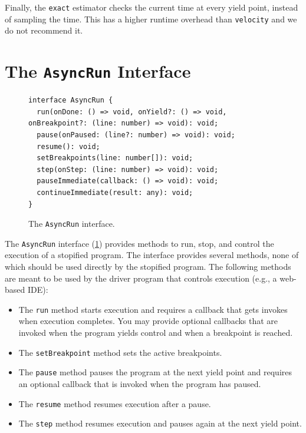 \documentclass[10pt]{book}
\begin{document}
Finally, the \texttt{exact} estimator checks the current time at every
yield point, instead of sampling the time. This has a higher runtime
overhead than \texttt{velocity} and we do not recommend it.

\section{The \texttt{AsyncRun} Interface\label{asyncrun}}
\lstset{language=js}

\begin{figure}
\lstset{language=js}
\begin{lstlisting}
interface AsyncRun {
  run(onDone: () => void, onYield?: () => void, onBreakpoint?: (line: number) => void): void;
  pause(onPaused: (line?: number) => void): void;
  resume(): void;
  setBreakpoints(line: number[]): void;
  step(onStep: (line: number) => void): void;
  pauseImmediate(callback: () => void): void;
  continueImmediate(result: any): void;
}
\end{lstlisting}
\caption{The \texttt{AsyncRun} interface.}
\label{asyncrun-interface}
\end{figure}

The \lstinline|AsyncRun| interface (\cref{asyncrun-interface}) provides methods
to run, stop, and control the execution of a stopified program. The
interface provides several methods, none of which should be used
directly by the stopified program. The following methods are meant to be
used by the driver program that controls execution (e.g., a web-based IDE):

\begin{itemize}

  \item The \lstinline|run| method starts execution and requires a callback that
  gets invokes when execution completes. You may provide optional callbacks
  that are invoked when the program yields control and when a breakpoint is reached.

  \item The \lstinline|setBreakpoint| method sets the active breakpoints.

  \item The \lstinline|pause| method pauses the program at the next yield point
  and requires an optional callback that is invoked when the program has paused.

  \item The \lstinline|resume| method resumes execution after a pause.

  \item The \lstinline|step| method resumes execution and pauses again at the
  next yield point.

\end{itemize}
\end{document}
